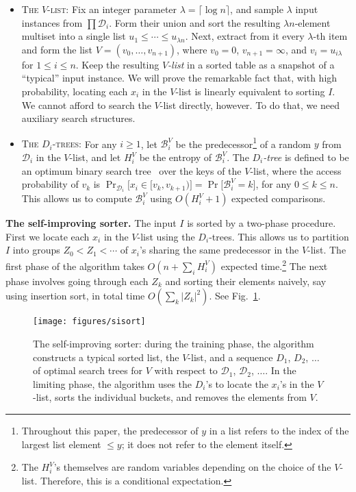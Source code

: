 \documentclass{siamltex}
\newcommand{\D}{\mathcal{D}}
\newcommand{\pred}{\mathcal{B}}
\begin{document}
\begin{itemize}
\item
\textsc{The $V$-list:}
Fix an integer parameter $\lambda = \lceil\log n\rceil$,
and sample $\lambda$ input instances from $\prod \D_i$. 
Form their union and sort the resulting $\lambda n$-element multiset
into a single list $u_1\leq \cdots \leq u_{\lambda  n}$.
Next, extract from it every $\lambda $-th item and form the list 
$V=(v_0,\ldots, v_{n+1})$, where $v_0=0$, $v_{n+1}=\infty$,
and $v_i= u_{i \lambda }$ for $1\leq i \leq n$.
Keep the resulting \emph{$V$-list} in a sorted table as 
a snapshot of a ``typical'' input instance.
We will prove the remarkable fact that,
with high probability, locating each $x_i$ in the $V$-list
is linearly equivalent to sorting $I$.
We cannot afford to search the $V$-list
directly, however. To do that, we need auxiliary search structures.

\item
\textsc{The $D_i$-trees:}
For any $i \geq 1$, let $\pred^V_i$ 
be the predecessor\footnote{Throughout this paper,
the predecessor of $y$ in a list refers to the index of
the largest list element $\leq y$; it does not
refer to the element itself.}
of a random $y$ from $\D_i$ 
in the $V$-list, and let $H_i^V$ be the entropy of 
$\pred^V_i$.
The \emph{$D_i$-tree} is defined to be an optimum binary search 
tree~\cite{Mehlhorn} over 
the keys of the $V$-list, where the access probability of 
$v_k$ is $\Pr_{\D_i}\bigl[x_i \in [v_k, v_{k+1})\bigr] = 
\Pr\bigl[\pred_i^V = k\bigr]$,
for any $0\leq k\leq n$.
This allows us to compute $\pred^V_i$
using $O(H_i^V +1)$ expected comparisons.

\end{itemize}

\textbf{The self-improving sorter.} The input $I$ is sorted 
by a two-phase procedure.  First we locate each $x_i$ in 
the $V$-list using the $D_i$-trees. This allows us to 
partition $I$ into groups $Z_0< Z_1 < \cdots$
of $x_i$'s sharing the same predecessor in the $V$-list.
The first phase of the algorithm takes $O(n+ \sum_i H_i^V)$ 
expected time.\footnote{The $H_i^V$'s themselves are 
random variables depending on the choice of the $V$-list. 
Therefore, this is a conditional expectation.}
The next phase involves going through each $Z_k$ and
sorting their elements naively, say using insertion sort, in
total time $O(\sum_k |Z_k|^2)$. See Fig.~\ref{fig:sisort}.
\medskip

\begin{figure}
\begin{center}
\texttt{[image: figures/sisort]}
\end{center}
\caption{The self-improving sorter: during the training phase, the algorithm
constructs a typical sorted list, the $V$-list, 
and a sequence $D_1$, $D_2$, $\ldots$
of optimal search trees for $V$ with respect to $\D_1$, $\D_2$, $\ldots$.
In the limiting phase, the algorithm uses the $D_i$'s to locate the 
$x_i$'s in the $V$-list, sorts the individual buckets, and removes the
elements from $V$.}
\label{fig:sisort}
\end{figure}
\end{document}

